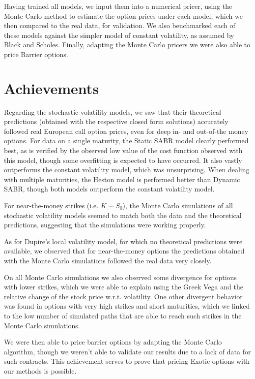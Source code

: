 Having trained all models, we input them into a numerical pricer, using the Monte Carlo method to estimate the option prices under each model, which we then compared to the real data, for validation. We also benchmarked each of these models against the simpler model of constant volatility, as assumed by Black and Scholes.
Finally, adapting the Monte Carlo pricers we were also able to price Barrier options.

\section{Achievements}
Regarding the stochastic volatility models, we saw that their theoretical predictions (obtained with the respective closed form solutions) accurately followed real European call option prices, even for deep in- and out-of-the money options.
For data on a single maturity, the Static SABR model clearly performed best, as is verified by the observed low value of the cost function observed with this model, though some overfitting is expected to have occurred. It also vastly outperforms the constant volatility model, which was unsurprising. When dealing with multiple maturities, the Heston model is performed better than Dynamic SABR, though both models outperform the constant volatility model.

For near-the-money strikes (i.e. $K\sim S_0$), the Monte Carlo simulations of all stochastic volatility models seemed to match both the data and the theoretical predictions, suggesting that the simulations were working properly.

As for Dupire's local volatility model, for which no theoretical predictions were available, we observed that for near-the-money options the predictions obtained with the Monte Carlo simulations followed the real data very closely.

On all Monte Carlo simulations we also observed some divergence for options with lower strikes, which we were able to explain using the Greek Vega and the relative change of the stock price w.r.t. volatility. One other divergent behavior was found in options with very high strikes and short maturities, which we linked to the low number of simulated paths that are able to reach such strikes in the Monte Carlo simulations.

We were then able to price barrier options by adapting the Monte Carlo algorithm, though we weren't able to validate our results due to a lack of data for such contracts. This achievement serves to prove that pricing Exotic options with our methods is possible.


